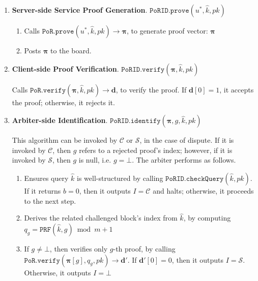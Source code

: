 \begin{enumerate}
\item\textbf{Server-side Service Proof Generation}. $\mathtt{PoRID.prove}(u^{\scriptscriptstyle *},\hat{k},pk)$ 
\begin{enumerate}
\item Calls $\mathtt{PoR.prove}(u^{\scriptscriptstyle *},\hat{k},pk)\rightarrow  {\bm{\pi}}$, to generate proof vector: $ {\bm{\pi}}$ 
\item Posts $ {\bm{\pi}}$ to the board. 
\end{enumerate}

\item\textbf{Client-side Proof Verification}. $\mathtt{PoRID.verify}( {\bm{\pi}},\hat{k} ,pk)$

 Calls $\mathtt{PoR.verify}( {\bm{\pi}},\hat{k} ,pk)\rightarrow  {\bm{d}}$, to verify the proof. If $ {\bm{d}}[0] = 1$,  it accepts the proof; otherwise, it rejects it.

\item\textbf{Arbiter-side Identification}. $\mathtt{PoRID.identify}( {\bm{\pi}}, g,\hat{k},pk)$ 

This algorithm can be invoked by $\mathcal{C}$ or $\mathcal{S}$, in the case of dispute. If it is invoked by $\mathcal{C}$, then $g$ refers to a rejected proof's  index; however, if it is invoked by $\mathcal{S}$, then $g$ is null, i.e.  $g=\bot$. The arbiter performs as follows. 


\begin{enumerate}


\item Ensures  query $\hat{k}$ is well-structured by calling $\mathtt{PoRID.checkQuery}(\hat{k}, pk)$. If it returns $b=0$, then it outputs $I=\mathcal C$ and halts; otherwise, it proceeds to the next step. 



\item Derives the related challenged block's index from $\hat{k}$, by computing $q_{\scriptscriptstyle g}=\mathtt{PRF}(\hat{k},g)\bmod m+1$ 



\item If $g\neq \bot$, then verifies only $g$-th proof, by calling $\mathtt{PoR.verify}( {\bm{\pi}}[g],q_{\scriptscriptstyle g},pk)\rightarrow  {\bm{d}}'$. If $ {\bm{d}}'[0]=0$, then it outputs $I=\mathcal S$. Otherwise, it outputs $I=\bot$
\end{enumerate}
\end{enumerate}

